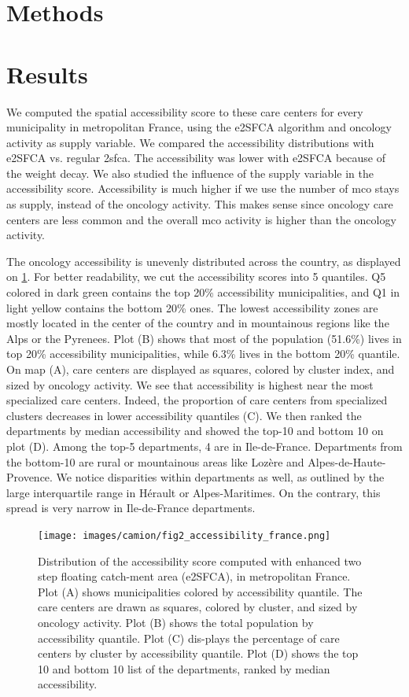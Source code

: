 \section{Methods}

\section{Results}

We computed the spatial accessibility score to these care centers for every municipality in metropolitan France, using the e2SFCA algorithm and oncology activity as supply variable. We compared the accessibility distributions with e2SFCA vs. regular \ac{2sfca}. The accessibility was lower with e2SFCA because of the weight decay. We also studied the influence of the supply variable in the accessibility score. Accessibility is much higher if we use the number of \ac{mco} stays as supply, instead of the oncology activity. This makes sense since oncology care centers are less common and the overall \ac{mco} activity is higher than the oncology activity.

The oncology accessibility is unevenly distributed across the country, as displayed on \cref{fig:accessibility-france}. For better readability, we cut the accessibility scores into 5 quantiles. Q5 colored in dark green contains the top 20\% accessibility municipalities, and Q1 in light yellow contains the bottom 20\% ones. The lowest accessibility zones are mostly located in the center of the country and in mountainous regions like the Alps or the Pyrenees. Plot (B) shows that most of the population (51.6\%) lives in top 20\% accessibility municipalities, while 6.3\% lives in the bottom 20\% quantile. On map (A), care centers are displayed as squares, colored by cluster index, and sized by oncology activity. We see that accessibility is highest near the most specialized care centers. Indeed, the proportion of care centers from specialized clusters decreases in lower accessibility quantiles (C). We then ranked the departments by median accessibility and showed the top-10 and bottom 10 on plot (D). Among the top-5 departments, 4 are in Ile-de-France. Departments from the bottom-10 are rural or mountainous areas like Lozère and Alpes-de-Haute-Provence.  We notice disparities within departments as well, as outlined by the large interquartile range in Hérault or Alpes-Maritimes. On the contrary, this spread is very narrow in Ile-de-France departments.

\begin{figure}[h]
    \texttt{[image: images/camion/fig2\_accessibility\_france.png]}
    \centering
    \caption{
        Distribution of the accessibility score computed with enhanced two step floating catch-ment area (e2SFCA), in metropolitan France. Plot (A) shows municipalities colored by accessibility quantile. The care centers are drawn as squares, colored by cluster, and sized by oncology activity. Plot (B) shows the total population by accessibility quantile. Plot (C) dis-plays the percentage of care centers by cluster by accessibility quantile. Plot (D) shows the top 10 and bottom 10 list of the departments, ranked by median accessibility.
    }
    \label{fig:accessibility-france}
\end{figure}

